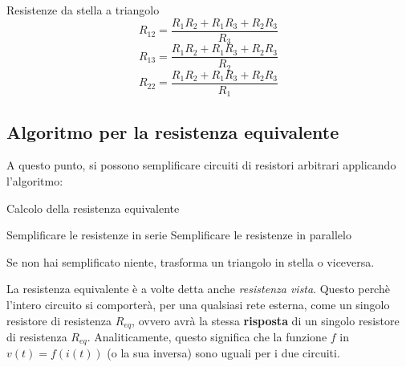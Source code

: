 \documentclass[a4paper,11pt]{article}
\begin{document}
\begin{theorem}{Resistenze da stella a triangolo}	
$$
R_{12} = \frac{R_1R_2 + R_1R_3 + R_2R_3}{R_3}
$$
$$
R_{13} = \frac{R_1R_2 + R_1R_3 + R_2R_3}{R_2}
$$
$$
R_{22} = \frac{R_1R_2 + R_1R_3 + R_2R_3}{R_1}
$$
\end{theorem}

\subsection{Algoritmo per la resistenza equivalente}
A questo punto, si possono semplificare circuiti di resistori arbitrari applicando l'algoritmo:
\begin{algorithm}
\caption{Calcolo della resistenza equivalente}
\begin{algorithmic}

	\STATE Semplificare le resistenze in serie
	\STATE Semplificare le resistenze in parallelo
	
	\STATE Se non hai semplificato niente, trasforma un triangolo in stella o viceversa.

	\ENDWHILE
\end{algorithmic}
\end{algorithm}

La resistenza equivalente è a volte detta anche \textit{resistenza vista}. 
Questo perchè l'intero circuito si comporterà, per una qualsiasi rete esterna, come un singolo resistore di resistenza $R_{eq}$, ovvero avrà la stessa \textbf{risposta} di un singolo resistore di resistenza $R_{eq}$.
Analiticamente, questo significa che la funzione $f$ in $v(t) = f(i(t))$ (o la sua inversa) sono uguali per i due circuiti.
\end{document}
